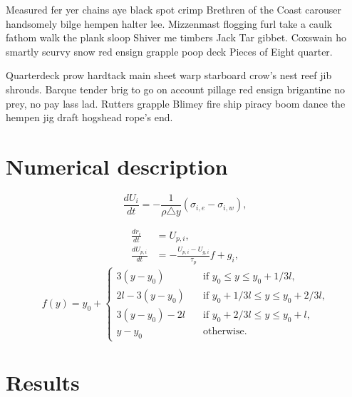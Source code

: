 \documentclass[review,3p]{elsarticle}
\begin{document}
Measured fer yer chains aye black spot crimp Brethren of the Coast carouser handsomely bilge hempen halter lee. Mizzenmast flogging furl take a caulk fathom walk the plank sloop Shiver me timbers Jack Tar gibbet. Coxswain ho smartly scurvy snow red ensign grapple poop deck Pieces of Eight quarter.

Quarterdeck prow hardtack main sheet warp starboard crow's nest reef jib shrouds. Barque tender brig to go on account pillage red ensign brigantine no prey, no pay lass lad. Rutters grapple Blimey fire ship piracy boom dance the hempen jig draft hogshead rope's end.


\section{Numerical description} \label{s:model}

\lipsum[1]
%
\begin{equation}
    \frac{dU_i}{dt} =-\frac{1}{\rho\triangle
    y}\left(\sigma_{i,e}-\sigma_{i,w}\right),
    \label{e:viscousEvol}
\end{equation}
%

\lipsum[1]
%
\begin{align}
    \frac{dr_{i}}{dt} & =U_{p,i}, \label{e:ppos}\\
    \frac{dU_{p,i}}{dt} & =-\frac{U_{p,i}-U_{g,i}}{\tau_{p}}f+g_{i}, \label{e:pmom}
\end{align}
%
\lipsum[1]
%
\begin{equation}
    f\left(y\right) = y_0 + 
    \begin{cases} 
        3\left(y-y_0\right) & \quad \text{if $y_0\leq y \leq y_0+1/3l$,}\\
        2l-3\left(y-y_0\right) & \quad \text{if $y_0+1/3l\leq y \leq y_0+2/3l$,}\\
        3\left(y-y_0\right)-2l & \quad \text{if $y_0+2/3l\leq y \leq y_0+l$,}\\
        y-y_0 & \quad \text{otherwise.}
    \end{cases}
\end{equation}
%


\section{Results} \label{s:results}
\end{document}

